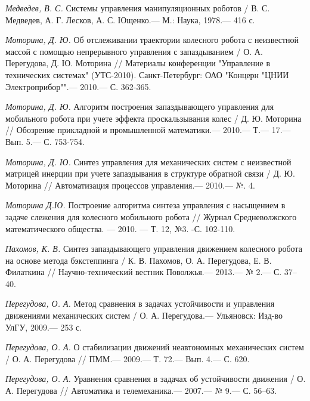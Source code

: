 \begin{thebibliography}{10}
	{\it Медведев, В. С.} Системы управления манипуляционных роботов / В. С. Медведев,
	А. Г. Лесков, А. С. Ющенко.— М.: Наука, 1978.— 416 с.
	
	{\it Моторина, Д. Ю.} Об отслеживании траектории колесного робота с неизвестной массой с помощью непрерывного управления с запаздыванием / О. А. Перегудова, Д. Ю. Моторина // Материалы конференции "Управление в технических системах" (УТС-2010). Санкт-Петербург: ОАО "Концерн "ЦНИИ Электроприбор"".—  2010.— С. 362-365.
	
	{\it Моторина, Д. Ю.} Алгоритм построения запаздывающего управления для мобильного робота при учете эффекта проскальзывания колес / Д. Ю. Моторина // Обозрение прикладной и промышленной математики.—  2010.— Т.— 17.— Вып. 5.— С. 753-754.
	
	{\it Моторина, Д. Ю.} Синтез управления для механических систем с неизвестной матрицей инерции при учете запаздывания в структуре обратной связи / Д. Ю. Моторина // Автоматизация процессов управления.—  2010.— №. 4.
	
	{\it Моторина Д.Ю.} Построение алгоритма синтеза управления с насыщением в задаче слежения для колесного мобильного робота // Журнал Средневолжского математического общества. — 2010. — Т. 12, №3. -С. 102-110.
	
	
	{\it Пахомов, К. В.} Синтез запаздывающего управления движением колесного робота на основе метода бэкстеппинга /
	К. В. Пахомов, О. А. Перегудова, Е. В. Филаткина // Научно-технический вестник Поволжья.— 2013.— № 2.— С. 37–40.
	
	{\it Перегудова, О. А.} Метод сравнения в задачах устойчивости и управления движениями
	механических систем / О. А. Перегудова.— Ульяновск: Изд-во УлГУ, 2009.— 253 с.
	
	{\it Перегудова, О. А.} О стабилизации движений неавтономных механических систем / О. А. Перегудова // ПММ.—  2009.— Т. 72.— Вып. 4.— С. 620.
	
	{\it Перегудова, О. А.} Уравнения сравнения в задачах об устойчивости движения / О. А. Перегудова // Автоматика и телемеханика.—  2007.— № 9.— С. 56–63.
	

\end{thebibliography}

